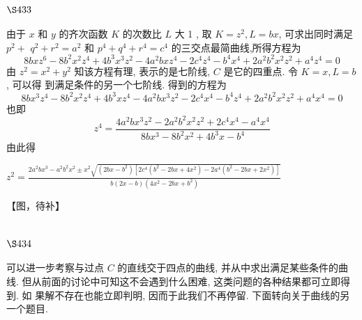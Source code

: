 \section{$\S 433$}

由于 $x$ 和 $y$ 的齐次函数 $K$ 的次数比 $L$ 大 1 , 取 $K=z^{2}, L=b x$, 可求出同时满足 $p^{2}+$ $q^{2}+r^{2}=a^{2}$ 和 $p^{4}+q^{4}+r^{4}=c^{4}$ 的三交点最简曲线,所得方程为
\[
8 b x z^{6}-8 b^{2} x^{2} z^{4}+4 b^{3} x^{3} z^{2}-4 a^{2} b x z^{4}-2 c^{4} z^{4}-b^{4} x^{4}+2 a^{2} b^{2} x^{2} z^{2}+a^{4} z^{4}=0
\]
由 $z^{2}=x^{2}+y^{2}$ 知该方程有理, 表示的是七阶线, $C$ 是它的四重点. 令 $K=x, L=b$, 可以得 到满足条件的另一个七阶线. 得到的方程为
\[
8 b x^{3} z^{4}-8 b^{2} x^{2} z^{4}+4 b^{3} x z^{4}-4 a^{2} b x^{3} z^{2}-2 c^{4} x^{4}-b^{4} z^{4}+2 a^{2} b^{2} x^{2} z^{2}+a^{4} x^{4}=0
\]
也即
\[
z^{4}=\frac{4 a^{2} b x^{3} z^{2}-2 a^{2} b^{2} x^{2} z^{2}+2 c^{4} x^{4}-a^{4} x^{4}}{8 b x^{3}-8 b^{2} x^{2}+4 b^{3} x-b^{4}}
\]
由此得

$z^{2}=\frac{2 a^{2} b x^{3}-a^{2} b^{2} x^{2} \pm x^{2} \sqrt{\left(2 b x-b^{2}\right)\left[2 c^{4}\left(b^{2}-2 b x+4 x^{2}\right)-2 a^{4}\left(b^{2}-2 b x+2 x^{2}\right)\right]}}{b(2 x-b)\left(4 x^{2}-2 b x+b^{2}\right)}$ 


【图，待补】

\section{$\S 434$}

可以进一步考察与过点 $C$ 的直线交于四点的曲线, 并从中求出满足某些条件的曲 线. 但从前面的讨论中可知这不会遇到什么困难, 这类问题的各种结果都可立即得到. 如 果解不存在也能立即判明, 因而于此我们不再停留. 下面转向关于曲线的另一个题目. 

